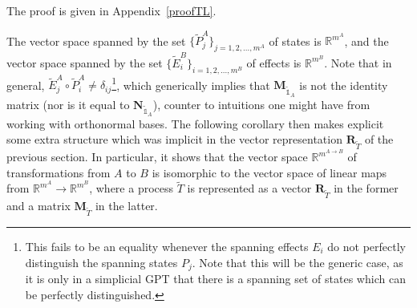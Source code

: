 \documentclass[10pt,twocolumn,aps,groupedaddress,nofootinbib]{revtex4}
\newcommand{\david}{\color{blue}}
\newcommand{\blk}{\color{black}}
\begin{document}
The proof is given in Appendix~\ref{proofTL}.


The vector space spanned by the set  $\{\widetilde{P}_{j}^A \}_{j = 1,2,...,m^A}$ of states is $\mathds{R}^{m^A}$, and the vector space spanned by the set $\{\widetilde{E}_{i}^B \}_{i= 1,2,...,m^B}$ of effects is $\mathds{R}^{m^B}$.
Note that in general, $\widetilde{E}_j^A\circ\widetilde{P}_i^A \ne \delta_{ij}$\footnote{This fails to be an equality whenever the spanning effects $E_i$ do not perfectly distinguish the spanning states $P_j$. Note that this will be the generic case, as it is only in a simplicial GPT that there is a spanning set of states which can be perfectly distinguished.
}, which generically implies that $\mathbf{M}_{{\widetilde{\mathds{1}}}_A}$ is not the identity matrix (nor is it equal to $\mathbf{N}_{\widetilde{\mathds{1}}_A}$), counter to intuitions one might have from working with orthonormal bases.
The following corollary then makes explicit some extra structure which was implicit in the vector representation $\mathbf{R}_{\widetilde{T}}$ of the previous section. In particular, it
 shows that the vector space $\mathds{R}^{m^{A\to B}}$ of transformations from $A$ to $B$ is isomorphic to the vector space of linear maps from $\mathds{R}^{m^A}\to \mathds{R}^{m^B}$, where a process $\widetilde{T}$ is represented as a vector $\mathbf{R}_{\widetilde{T}}$ in the former and a matrix $\mathbf{M}_{\widetilde{T}}$ in the latter.
\end{document}
